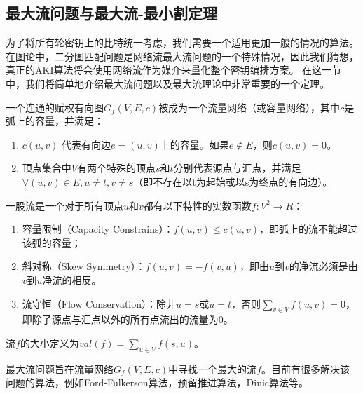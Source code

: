 \subsection{最大流问题与最大流-最小割定理}
为了将所有轮密钥上的比特统一考虑，我们需要一个适用更加一般的情况的算法。
在图论中，二分图匹配问题是网络流最大流问题的一个特殊情况，因此我们猜想，真正的AKI算法将会使用网络流作为媒介来量化整个密钥编排方案。
在这一节中，我们将简单地介绍最大流问题以及最大流理论中非常重要的一个定理。
\begin{defn}[流量网络]
    一个连通的赋权有向图$G_f(V,E,c)$被成为一个流量网络（或容量网络），其中$c$是弧上的容量，并满足：
    \begin{enumerate}
        \item $c(u,v)$ 代表有向边$e=(u,v)$上的容量。如果$e\notin E$，则$c(u,v)=0$。
        \item 顶点集合中$V$有两个特殊的顶点$s$和$t$分别代表源点与汇点，并满足$\forall(u,v)\in E,u\neq t,v\neq s$（即不存在以t为起始或以s为终点的有向边）。
    \end{enumerate}
\end{defn}
\begin{defn}[流]
    一股流是一个对于所有顶点$u$和$v$都有以下特性的实数函数$f:V^2\rightarrow R$：
    \begin{enumerate}
        \item 容量限制（Capacity Constrains）：$f(u,v)\leq c(u,v)$，即弧上的流不能超过该弧的容量；
        \item 斜对称（Skew Symmetry）：$f(u,v)=-f(v,u)$，即由$u$到$v$的净流必须是由$v$到$u$净流的相反。
        \item 流守恒（Flow Conservation）：除非$u=s$或$u=t$，否则$\sum_{v\in V}f(u,v)=0$，即除了源点与汇点以外的所有点流出的流量为0。
    \end{enumerate}
    流$f$的大小定义为$val(f)=\sum_{u\in V}f(s,u)$。
\end{defn}
最大流问题旨在流量网络$G_f(V,E,c)$中寻找一个最大的流$f$。目前有很多解决该问题的算法，例如Ford-Fulkerson算法，预留推进算法，Dinic算法等。

